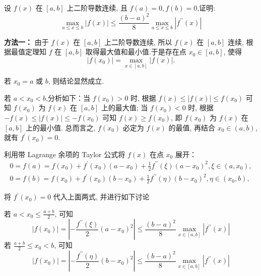 \begin{tcolorbox}[breakable,
		colframe=white!10!jingga, coltitle=white!90!jingga, colback=white!95!jingga, coltext=black, colbacktitle=white!10!jingga, enhanced, fonttitle=\bfseries,fontupper=\normalsize, attach boxed title to top left={yshift=-2mm}, before skip=8pt, after skip=8pt,
		title=解答题]

 设 $ {f}({x}) $ 在 $ [{a}, {b}] $ 上二阶导数连续, 且 $ {f}({a})=0, {f}({b})=0 $,证明:
$$
\max _{a \leqslant x \leqslant b}|f(x)| \leq \frac{(b-a)^{2}}{8} \max _{a \leqslant x \leqslant b}\left|f^{\prime \prime}(x)\right|
$$
 \tcblower

 \hspace{2em}\textbf{方法一：}
由于 $ f(x) $ 在 $ [a, b] $ 上二阶导数连续, 所以 $ f(x) $ 在 $ [a, b] $ 连续, 根据最值定理知 $f$ 在 $ [a, b] $ 取得最大值和最小值.于是存在点 $ x_0 \in[a, b] $, 使得
$$
|f(x_0)|=\max _{x \in[a, b]}|f(x)| .
$$

  若 $ x_{0}=a $ 或 $ b $, 则结论显然成立. 
 
 若 $ a<x_{0}<b $,分析如下：当 $ f(x_0)>0 $ 时, 根据 $ f(x) \leq|f(x)| \leq f(x_0) $ 可知 $ f(x_0) $ 为 $ f(x) $ 在 $ [a, b] $ 上的最大值; 当 $ f(x_0)<0 $ 时, 根据 $ -f(x) \leq|f(x)| \leq-f(x_0) $ 可知 $ f(x) \geq f(x_0) $, 即 $ f(x_0) $ 为 $ f(x) $ 在 $ [a, b] $ 上的最小值. 总而言之, $ f(x_0) $ 必定为 $ f(x) $ 的最值, 再结合 $ x_0 \in(a, b) $, 就有 $ f^{\prime}(x_0)=0 $.
 
 利用带 Lagrange 余项的 Taylor 公式将 $ f(x) $ 在点 $ x_{0} $ 展开：
$$
\begin{array}{l}
0=f(a)=f\left(x_{0}\right)+f^{\prime}\left(x_{0}\right)\left(a-x_{0}\right)+\frac{1}{2} f^{\prime \prime}(\xi)\left(a-x_{0}\right)^{2}, \xi \in\left(a, x_{0}\right), \\
0=f(b)=f\left(x_{0}\right)+f^{\prime}\left(x_{0}\right)\left(b-x_{0}\right)+\frac{1}{2} f^{\prime \prime}(\eta)\left(b-x_{0}\right)^{2}, \eta \in\left(x_{0}, b\right),
\end{array}
$$

将 $f^{\prime}\left(x_{0}\right)=0 $ 代入上面两式, 并进行如下讨论

若 $ a<x_0 \leq \frac{a+b}{2} $, 可知 $$ |f(x_0)|=\left|-\frac{f^{\prime \prime}(\xi)}{2}(a-x_0)^{2}\right| \leq \frac{(b-a)^{2}}{8} \max _{x \in[a, b]}\left|f^{\prime \prime}(x)\right| $$
若 $ \frac{a+b}{2} \leq x_0<b $, 可知 $$ |f(x_0)|=\left|-\frac{f^{\prime \prime}(\eta)}{2}(b-x_0)^{2}\right| \leq \frac{(b-a)^{2}}{8} \max _{x \in[a, b]}\left|f^{\prime \prime}(x)\right| $$


\end{tcolorbox}
